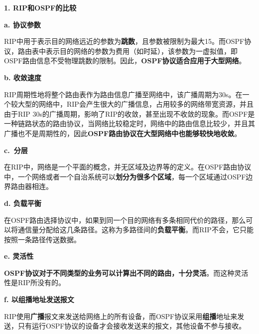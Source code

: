 \textbf{{1. RIP和OSPF的比较}}

\textbf{{a. 协议参数}}

RIP中用于表示目的网络远近的参数为\textbf{跳数}，且参数被限制为最大15。而OSPF协议，路由表中表示目的网络的参数为费用（如时延），该参数为一虚拟值，即OSPF路由信息不受物理跳数的限制。因此，\textbf{OSPF协议适合应用于大型网络}。

\textbf{{b. 收敛速度}}

RIP周期性地将整个路由表作为路由信息广播至网络中，该广播周期为30s。在一个较大型的网络中，RIP会产生很大的广播信息，占用较多的网络带宽资源，并且由于RIP
30s的广播周期，影响了RIP的收敛，甚至出现不收敛的现象。而OSPF是一种链路状态的路由协议，当网络比较稳定时，网络中的路由信息比较少，并且其广播也不是周期性的，因此\textbf{OSPF路由协议在大型网络中也能够较快地收敛}。

\textbf{{c.~分层}}

在RIP中，网络是一个平面的概念，并无区域及边界等的定义。在OSPF路由协议中，一个网络或者一个自治系统可以\textbf{划分为很多个区域}，每一个区域通过OSPF边界路由器相连。

\textbf{{d. 负载平衡}}

在OSPF路由选择协议中，如果到同一个目的网络有多条相同代价的路径，那么可以将通信量分配给这几条路径。这称为多路径间的\textbf{负载平衡}。而RIP不会，它只能按照一条路径传送数据。

\textbf{{e. 灵活性}}

\textbf{OSPF协议对于不同类型的业务可以计算出不同的路由，十分灵活}。而这种灵活性是RIP所没有的。

\textbf{{f. 以组播地址发送报文}}

RIP使用{\textbf{广播}}报文来发送给网络上的所有设备，而OSPF协议采用{\textbf{组播}}地址来发送，只有运行OSPF协议的设备才会接收发送来的报文，其他设备不参与接收。
